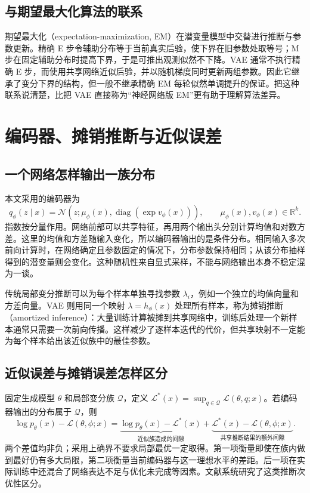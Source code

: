 \documentclass[UTF8,12pt,a4paper,fontset=fandol]{ctexart}
\begin{document}
\subsection{与期望最大化算法的联系}
期望最大化（expectation-maximization, EM）在潜变量模型中交替进行推断与参数更新。精确 E 步令辅助分布等于当前真实后验，使下界在旧参数处取等号；M 步在固定辅助分布时提高下界，于是可推出观测似然不下降。VAE 通常不执行精确 E 步，而使用共享网络近似后验，并以随机梯度同时更新两组参数。因此它继承了变分下界的结构，但一般不继承精确 EM 每轮似然单调提升的保证。把这种联系说清楚，比把 VAE 直接称为“神经网络版 EM”更有助于理解算法差异。

\section{编码器、摊销推断与近似误差}
\label{sec:vae-amortization}

\subsection{一个网络怎样输出一族分布}
本文采用的编码器为
\begin{equation}
 q_\phi(z\mid x)=\mathcal N\!\left(z;\mu_\phi(x),
                  \operatorname{diag}(\exp v_\phi(x))\right),
 \qquad \mu_\phi(x),v_\phi(x)\in\mathbb R^k.
 \label{eq:vae-encoder}
\end{equation}
指数按分量作用。网络前部可以共享特征，再用两个输出头分别计算均值和对数方差。这里的均值和方差随输入变化，所以编码器输出的是条件分布。相同输入多次前向计算时，在网络确定且参数固定的情况下，分布参数保持相同；从该分布抽样得到的潜变量则会变化。这种随机性来自显式采样，不能与网络输出本身不稳定混为一谈。

传统局部变分推断可以为每个样本单独寻找参数 $\lambda_i$，例如一个独立的均值向量和方差向量。VAE 则用同一个映射 $\lambda=h_\phi(x)$ 处理所有样本，称为摊销推断（amortized inference）：大量训练计算被摊到共享网络中，训练后处理一个新样本通常只需要一次前向传播。这样减少了逐样本迭代的代价，但共享映射不一定能为每个样本给出该近似族中的最佳参数。

\subsection{近似误差与摊销误差怎样区分}
固定生成模型 $\theta$ 和局部变分族 $\mathcal Q$，定义 $\mathcal L^*(x)=\sup_{q\in\mathcal Q}\mathcal L(\theta,q;x)$。若编码器输出的分布属于 $\mathcal Q$，则
\begin{equation}
 \log p_\theta(x)-\mathcal L(\theta,\phi;x)
 =\underbrace{\log p_\theta(x)-\mathcal L^*(x)}_{\text{近似族造成的间隙}}
 +\underbrace{\mathcal L^*(x)-\mathcal L(\theta,\phi;x)}_{\text{共享推断结果的额外间隙}}.
 \label{eq:vae-amortization-gap}
\end{equation}
两个差值均非负；采用上确界不要求局部最优一定取得。第一项衡量即使在族内做到最好仍有多大局限，第二项衡量当前编码器与这一理想水平的差距。后一项在实际训练中还混合了网络表达不足与优化未完成等因素。文献\cite{cremer2018}系统研究了这类推断次优性区分。
\end{document}
